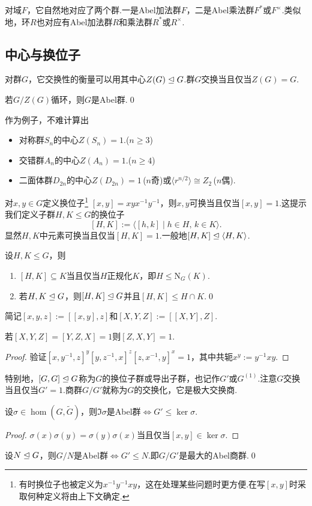 对域$F$，它自然地对应了两个群.一是Abel加法群$F$，二是Abel乘法群$F^*$或$F^\times$.类似地，环$R$也对应有Abel加法群$R$和乘法群$R^*$或$R^\times$.

\subsection{中心与换位子}
对群$G$，它交换性的衡量可以用其中心$Z(G)\trianglelefteq G$.群$G$交换当且仅当$Z(G)=G$.
\begin{prop}
	若$G/Z(G)$循环，则$G$是Abel群.\qed
\end{prop}

作为例子，不难计算出
\begin{itemize}
	\item 对称群$S_n$的中心$Z(S_n)=1$.($n\ge 3$)
	\item 交错群$A_n$的中心$Z(A_n)=1$.($n\ge 4$)
	\item 二面体群$D_{2n}$的中心$Z(D_{2n})=1$\,($n$奇)或$\langle r^{n/2}\rangle \cong Z_2$\,($n$偶).
\end{itemize}

对$x,y\in G$定义{\heiti 换位子}\footnote{有时换位子也被定义为$x^{-1}y^{-1}xy$，这在处理某些问题时更方便.在写$[x,y]$时采取何种定义将由上下文确定.} $[x,y]=xyx^{-1}y^{-1}$，则$x,y$可换当且仅当$[x,y]=1$.这提示我们定义子群$H,K\le G$的{\heiti 换位子}
\[
	[H,K]:=\langle [h,k]\mid h\in H,\,k\in K\rangle .
\]
显然$H,K$中元素可换当且仅当$[H,K]=1$.一般地$[H,K]\trianglelefteq\langle H,K\rangle $.
\begin{lemma}
	设$H,K\le G$，则
	\begin{enumerate}
		\item $[H,K]\subseteq K$当且仅当$H$正规化$K$，即$H\le\mathrm{N}_G(K)$.
		\item 若$H,K\trianglelefteq G$，则$[H,K]\trianglelefteq G$并且$[H,K]\le H\cap K$.\qed
	\end{enumerate}
\end{lemma}

简记$[x,y,z]:=[[x,y],z]$和$[X,Y,Z]:=[[X,Y],Z]$.
\begin{lemma*}[(三子群引理)]
	若$[X,Y,Z]=[Y,Z,X]=1$则$[Z,X,Y]=1$.
\end{lemma*}
\begin{proof}
	验证$[x,y^{-1},z]^y[y,z^{-1},x]^z[z,x^{-1},y]^x=1$，其中共轭$x^y:=y^{-1}xy$.
\end{proof}

特别地，$[G,G]\trianglelefteq G$称为$G$的{\heiti 换位子群}或{\heiti 导出子群}，也记作$G'$或$G^{(1)}$.注意$G$交换当且仅当$G'=1$.商群$G/G'$就称为$G$的{\heiti 交换化}，它是极大交换商.\hypertarget{text:Abelianization}{}
\begin{prop}
	设$\sigma\in\hom(G,\tilde{G})$，则$\Im\sigma$是Abel群$\iff G'\le\ker\sigma$.
\end{prop}
\begin{proof}
	$\sigma(x)\sigma(y)=\sigma(y)\sigma(x)$当且仅当$[x,y]\in\ker\sigma$.
\end{proof}
\begin{cor*}
	设$N\trianglelefteq G$，则$G/N$是Abel群$\iff G'\le N$.即$G/G'$是最大的Abel商群.\qed
\end{cor*}

